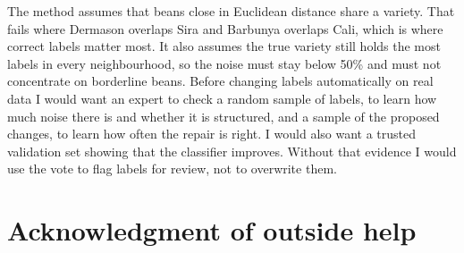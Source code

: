 \documentclass[11pt]{article}
\begin{document}
The method assumes that beans close in Euclidean distance share a variety. That fails
where Dermason overlaps Sira and Barbunya overlaps Cali, which is where correct labels
matter most. It also assumes the true variety still holds the most labels in every
neighbourhood, so the noise must stay below 50\% and must not concentrate on borderline
beans. Before changing labels automatically on real data I would want an expert to check
a random sample of labels, to learn how much noise there is and whether it is structured,
and a sample of the proposed changes, to learn how often the repair is right. I would
also want a trusted validation set showing that the classifier improves. Without that
evidence I would use the vote to flag labels for review, not to overwrite them.

\section*{Acknowledgment of outside help}

\end{document}
